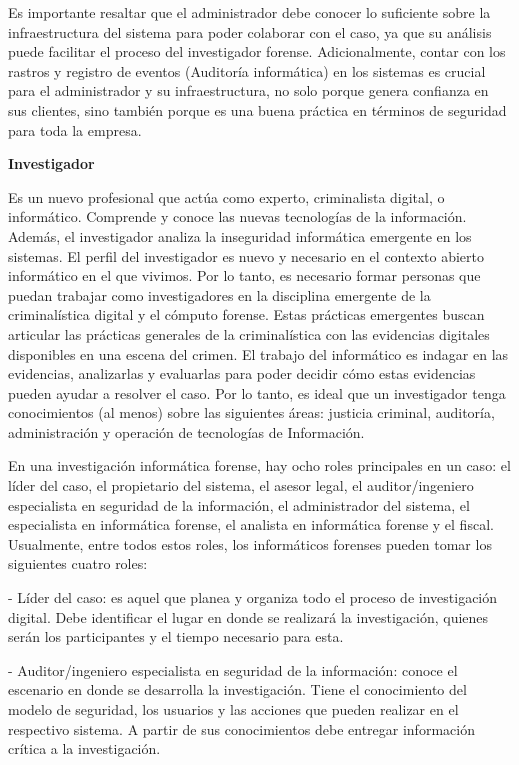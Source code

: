 Es importante resaltar que el administrador debe conocer lo suficiente sobre la infraestructura del sistema para poder colaborar con el caso, ya que su análisis puede facilitar el proceso del investigador forense. Adicionalmente, contar con los rastros y registro de eventos (Auditoría informática) en los sistemas es crucial para el administrador y su infraestructura, no solo porque genera confianza en sus clientes, sino también porque es una buena práctica en términos de seguridad para toda la empresa.

\textbf{Investigador}

Es un nuevo profesional que actúa como experto, criminalista digital, o informático. Comprende y conoce las nuevas tecnologías de la información. Además, el investigador analiza la inseguridad informática emergente en los sistemas. El perfil del investigador es nuevo y necesario en el contexto abierto informático en el que vivimos. Por lo tanto, es necesario formar personas que puedan trabajar como investigadores en la disciplina emergente de la criminalística digital y el cómputo forense. Estas prácticas emergentes buscan articular las prácticas generales de la criminalística con las evidencias digitales disponibles en una escena del crimen. El trabajo del informático es indagar en las evidencias, analizarlas y evaluarlas para poder decidir cómo estas evidencias pueden ayudar a resolver el caso. Por lo tanto, es ideal que un investigador tenga conocimientos (al menos) sobre las siguientes áreas: justicia criminal, auditoría, administración y operación de tecnologías de Información.

En una investigación informática forense, hay ocho roles principales en un caso: el líder del caso, el propietario del sistema, el asesor legal, el auditor/ingeniero especialista en seguridad de la información, el administrador del sistema, el especialista en informática forense, el analista en informática forense y el fiscal. Usualmente, entre todos estos roles, los informáticos forenses pueden tomar los siguientes cuatro roles:

- Líder del caso: es aquel que planea y organiza todo el proceso de investigación digital. Debe identificar el lugar en donde se realizará la investigación, quienes serán los participantes y el tiempo necesario para esta.

- Auditor/ingeniero especialista en seguridad de la información: conoce el escenario en donde se desarrolla la investigación. Tiene el conocimiento del modelo de seguridad, los usuarios y las acciones que pueden realizar en el respectivo sistema. A partir de sus conocimientos debe entregar información crítica a la investigación.


